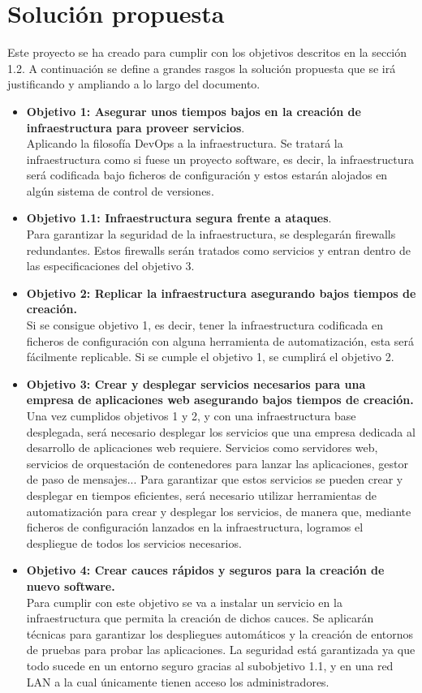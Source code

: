 \section{Solución propuesta}
\begin{text}
	Este proyecto se ha creado para cumplir con los objetivos descritos en la sección 1.2. A continuación se define a grandes rasgos la solución propuesta que se irá justificando y ampliando a lo largo del documento.
	\begin{itemize}
		\item \textbf{Objetivo 1: Asegurar unos tiempos bajos en la creación de infraestructura para proveer servicios}. \\ Aplicando la filosofía DevOps a la infraestructura. Se tratará la infraestructura como si fuese un proyecto software, es decir, la infraestructura será codificada bajo ficheros de configuración y estos estarán alojados en algún sistema de control de versiones.
		\item \textbf{Objetivo 1.1: Infraestructura segura frente a ataques}. \\ Para garantizar la seguridad de la infraestructura, se desplegarán firewalls redundantes. Estos firewalls serán tratados como servicios y entran dentro de las especificaciones del objetivo 3.
		\item \textbf{Objetivo 2: Replicar la infraestructura asegurando bajos tiempos de creación.} \\
		Si se consigue objetivo 1, es decir, tener la infraestructura codificada en ficheros de configuración con alguna herramienta de automatización, esta será fácilmente replicable. Si se cumple el objetivo 1, se cumplirá el objetivo 2.
		\item \textbf{Objetivo 3: Crear y desplegar servicios necesarios para una empresa de aplicaciones web asegurando bajos tiempos de creación.} \\
		Una vez cumplidos objetivos 1 y 2, y con una infraestructura base desplegada, será necesario desplegar los servicios que una empresa dedicada al desarrollo de aplicaciones web requiere. Servicios como servidores web, servicios de orquestación de contenedores para lanzar las aplicaciones, gestor de paso de mensajes... Para garantizar que estos servicios se pueden crear y desplegar en tiempos eficientes, será necesario utilizar herramientas de automatización para crear y desplegar los servicios, de manera que, mediante ficheros de configuración lanzados en la infraestructura, logramos el despliegue de todos los servicios necesarios.
		\item \textbf{Objetivo 4: Crear cauces rápidos y seguros para la creación de nuevo software.} \\
		Para cumplir con este objetivo se va a instalar un servicio en la infraestructura que permita la creación de dichos cauces. Se aplicarán técnicas para garantizar los despliegues automáticos y la creación de entornos de pruebas para probar las aplicaciones. La seguridad está garantizada ya que todo sucede en un entorno seguro gracias al subobjetivo 1.1, y en una red LAN a la cual únicamente tienen acceso los administradores.
	\end{itemize}
\end{text}
	
